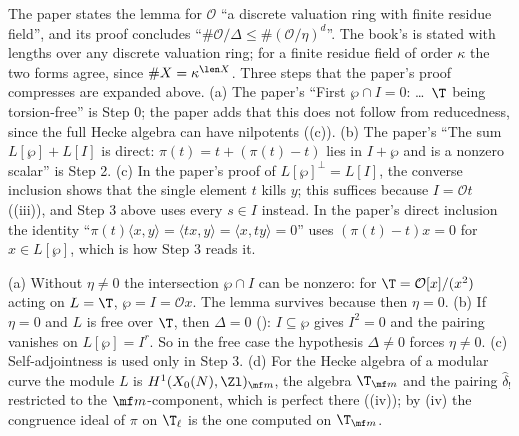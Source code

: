 \begin{remark}\label{rem:congruence:ddt417-commentary}
The paper states the lemma for $\mathcal O$ ``a discrete valuation ring with finite residue field'', and its proof concludes ``$\#\mathcal O/\Delta\le\#(\mathcal O/\eta)^d$''. The book's  is stated with
lengths over any discrete valuation ring; for a finite residue field of order $\kappa$ the two forms agree, since $\#X=\kappa^{\len X}$. Three steps that the paper's proof compresses are
expanded above. (a) The paper's ``First $\wp\cap I=0$: \dots\ $\T$ being torsion-free'' is Step 0; the paper adds that this does not follow from reducedness, since the
full Hecke algebra can have nilpotents ((c)). (b) The paper's ``The sum $L[\wp]+L[I]$ is direct: $\pi(t)=t+(\pi(t)-t)$ lies in $I+\wp$ and is a nonzero scalar'' is Step 2. (c) In the paper's proof of $L[\wp]^\perp=L[I]$, the converse inclusion shows that the single element $t$ kills $y$; this suffices
because $I=\mathcal O t$ ((iii)), and Step 3 above uses every $s\in I$ instead. In the paper's direct inclusion the identity
``$\pi(t)\langle x,y\rangle=\langle tx,y\rangle=\langle x,ty\rangle=0$'' uses $(\pi(t)-t)x=0$ for $x\in L[\wp]$, which is how Step 3 reads it.
\end{remark}

\begin{remark}\label{rem:congruence:ddt417-hypotheses}
(a) Without $\eta\ne0$ the intersection $\wp\cap I$ can be nonzero: for $\T=\mathcal O[x]/(x^2)$ acting on $L=\T$, $\wp=I=\mathcal Ox$. The lemma survives because then $\eta=0$. (b) If $\eta=0$ and $L$
is free over $\T$, then $\Delta=0$ (): $I\subseteq\wp$ gives $I^2=0$ and the pairing vanishes on $L[\wp]=I^r$. So in the free case the hypothesis $\Delta\ne0$ forces
$\eta\ne0$. (c) Self-adjointness is used only in Step 3. (d) For the Hecke algebra of a modular curve the module $L$ is $H^1(X_0(N),\Zl)_{\mf m}$, the algebra $\T_{\mf m}$ and the
pairing $\hat\delta_!$ restricted to the $\mf m$-component, which is perfect there ((iv)); by (iv) the
congruence ideal of $\pi$ on $\T_\ell$ is the one computed on $\T_{\mf m}$.
\end{remark}

